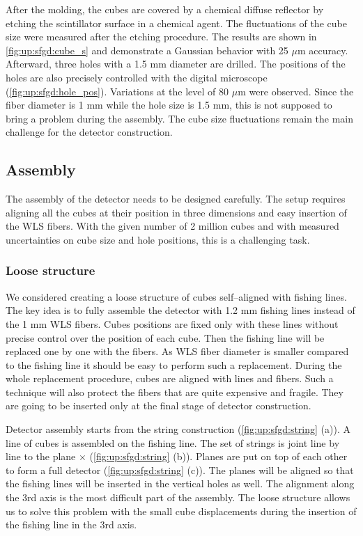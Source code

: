 \documentclass[main.tex]{subfiles}
\begin{document}
After the molding, the cubes are covered by a chemical diffuse reflector by etching the scintillator surface in a chemical agent. The fluctuations of the cube size were measured after the etching procedure. The results are shown in \autoref{fig:up:sfgd:cube_s} and demonstrate a Gaussian behavior with 25 $\mu$m accuracy. Afterward, three holes with a 1.5 mm diameter are drilled. The positions of the holes are also precisely controlled with the digital microscope (\autoref{fig:up:sfgd:hole_pos}). Variations at the level of 80 $\mu$m were observed. Since the fiber diameter is 1 mm while the hole size is 1.5 mm, this is not supposed to bring a problem during the assembly. The cube size fluctuations remain the main challenge for the detector construction.

\subsection{Assembly}
\label{sec:up:sfgd:ass}
The assembly of the detector needs to be designed carefully. The setup requires aligning all the cubes at their position in three dimensions and easy insertion of the WLS fibers. With the given number of 2 million cubes and with measured uncertainties on cube size and hole positions, this is a challenging task.

\subsubsection{Loose structure}
We considered creating a loose structure of cubes self--aligned with fishing lines. The key idea is to fully assemble the detector with 1.2 mm fishing lines instead of the 1 mm WLS fibers. Cubes positions are fixed only with these lines without precise control over the position of each cube. Then the fishing line will be replaced one by one with the fibers. As WLS fiber diameter is smaller compared to the fishing line it should be easy to perform such a replacement. During the whole replacement procedure, cubes are aligned with lines and fibers. Such a technique will also protect the fibers that are quite expensive and fragile. They are going to be inserted only at the final stage of detector construction.

Detector assembly starts from the string construction (\autoref{fig:up:sfgd:string} (a)). A line of \sfgdx{} cubes is assembled on the fishing line. The set of \sfgdz{} strings is joint line by line to the plane \sfgdx{}$\times$\sfgdz{} (\autoref{fig:up:sfgd:string} (b)). Planes are put on top of each other to form a full detector (\autoref{fig:up:sfgd:string} (c)). The planes will be aligned so that the fishing lines will be inserted in the vertical holes as well. The alignment along the 3rd axis is the most difficult part of the assembly. The loose structure allows us to solve this problem with the small cube displacements during the insertion of the fishing line in the 3rd axis.
\end{document}
